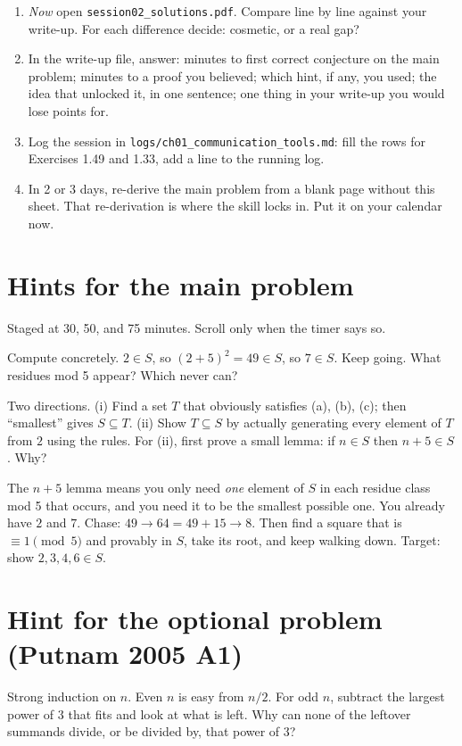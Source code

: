 \documentclass[11pt]{article}
\begin{document}
\begin{enumerate}
  \item \emph{Now} open \texttt{session02\_solutions.pdf}. Compare line by line against your write-up. For each difference decide: cosmetic, or a real gap?
  \item In the write-up file, answer: minutes to first correct conjecture on the main problem; minutes to a proof you believed; which hint, if any, you used; the idea that unlocked it, in one sentence; one thing in your write-up you would lose points for.
  \item Log the session in \texttt{logs/ch01\_communication\_tools.md}: fill the rows for Exercises 1.49 and 1.33, add a line to the running log.
  \item In 2 or 3 days, re-derive the main problem from a blank page without this sheet. That re-derivation is where the skill locks in. Put it on your calendar now.
\end{enumerate}

\clearpage
\section*{Hints for the main problem}
Staged at 30, 50, and 75 minutes. Scroll only when the timer says so.

\spoilerspace
\begin{hint}
Compute concretely. $2 \in S$, so $(2+5)^2 = 49 \in S$, so $7 \in S$. Keep going. What residues mod 5 appear? Which never can?
\end{hint}

\spoilerspace
\begin{hint}
Two directions. (i) Find a set $T$ that obviously satisfies (a), (b), (c); then ``smallest'' gives $S \subseteq T$. (ii) Show $T \subseteq S$ by actually generating every element of $T$ from $2$ using the rules. For (ii), first prove a small lemma: if $n \in S$ then $n + 5 \in S$. Why?
\end{hint}

\spoilerspace
\begin{hint}
The $n+5$ lemma means you only need \emph{one} element of $S$ in each residue class mod 5 that occurs, and you need it to be the smallest possible one. You already have $2$ and $7$. Chase: $49 \to 64 = 49 + 15 \to 8$. Then find a square that is $\equiv 1 \pmod 5$ and provably in $S$, take its root, and keep walking down. Target: show $2, 3, 4, 6 \in S$.
\end{hint}

\clearpage
\section*{Hint for the optional problem (Putnam 2005 A1)}
\spoilerspace
\begin{hint}
Strong induction on $n$. Even $n$ is easy from $n/2$. For odd $n$, subtract the largest power of $3$ that fits and look at what is left. Why can none of the leftover summands divide, or be divided by, that power of $3$?
\end{hint}
\end{document}
